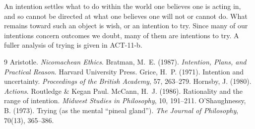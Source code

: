 \documentclass{situationist-preprint}
\begin{document}
An intention settles what to do within the world one believes one is acting in, and so cannot be directed at what one believes one will not or cannot do. What remains toward such an object is wish, or an intention to try. Since many of our intentions concern outcomes we doubt, many of them are intentions to try. A fuller analysis of trying is given in ACT-11-b.

\begin{thebibliography}{9}\small
{} Aristotle. \emph{Nicomachean Ethics}.
 Bratman, M.~E. (1987). \emph{Intention, Plans, and Practical Reason}. Harvard University Press.
 Grice, H.~P. (1971). Intention and uncertainty. \emph{Proceedings of the British Academy}, 57, 263--279.
 Hornsby, J. (1980). \emph{Actions}. Routledge \& Kegan Paul.
 McCann, H.~J. (1986). Rationality and the range of intention. \emph{Midwest Studies in Philosophy}, 10, 191--211.
 O'Shaughnessy, B. (1973). Trying (as the mental \enquote{pineal gland}). \emph{The Journal of Philosophy}, 70(13), 365--386.
\end{thebibliography}
\end{document}
